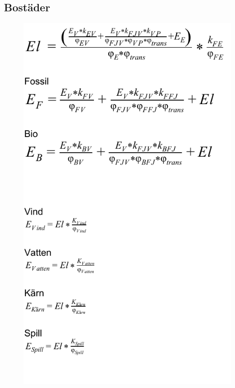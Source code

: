 \documentclass[a4paper,11pt,fleqn]{article}
\begin{document}
\subsection{Bostäder}
\begin{figure}[h!]
	\centering 
 		\includegraphics[scale = 0.75]{homes2.pdf}
		\label{diagram}
\end{figure}
\end{document}
